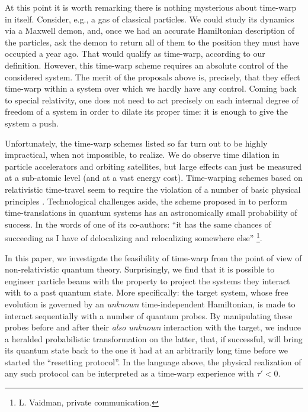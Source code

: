 \documentclass[twocolumn,prx,aps,longbibliography]{revtex4-1}
\begin{document}
At this point it is worth remarking there is nothing mysterious about time-warp in itself. Consider, e.g., a gas of classical particles. We could study its dynamics via a Maxwell demon, and, once we had an accurate Hamiltonian description of the particles, ask the demon to return all of them to the position they must have occupied a year ago. That would qualify as time-warp, according to our definition. However, this time-warp scheme requires an absolute control of the considered system. The merit of the proposals above is, precisely, that they effect time-warp within a system over which we hardly have any control. Coming back to special relativity, one does not need to act precisely on each internal degree of freedom of a system in order to dilate its proper time: it is enough to give the system a push.

Unfortunately, the time-warp schemes listed so far turn out to be highly impractical, when not impossible, to realize. We do observe time dilation in particle accelerators and orbiting satellites, but large effects can just be measured at a sub-atomic level (and at a vast energy cost). Time-warping schemes based on relativistic time-travel seem to require the violation of a number of basic physical principles \cite{visser, hawking}. Technological challenges aside, the scheme proposed in \cite{sandu} to perform time-translations in quantum systems has an astronomically small probability of success. In the words of one of its co-authors: ``it has the same chances of succeeding as I have of delocalizing and relocalizing somewhere else'' \footnote{L. Vaidman, private communication.}.



In this paper, we investigate the feasibility of time-warp from the point of view of non-relativistic quantum theory. Surprisingly, we find that it is possible to engineer particle beams with the property to project the systems they interact with to a past quantum state. More specifically: the target system, whose free evolution is governed by an \emph{unknown} time-independent Hamiltonian, is made to interact sequentially with a number of quantum probes. By manipulating these probes before and after their \emph{also unknown} interaction with the target, we induce a heralded probabilistic transformation on the latter, that, if successful, will bring its quantum state back to the one it had at an arbitrarily long time before we started the ``resetting protocol''. In the language above, the physical realization of any such protocol can be interpreted as a time-warp experience with $\tau'<0$.
\end{document}
